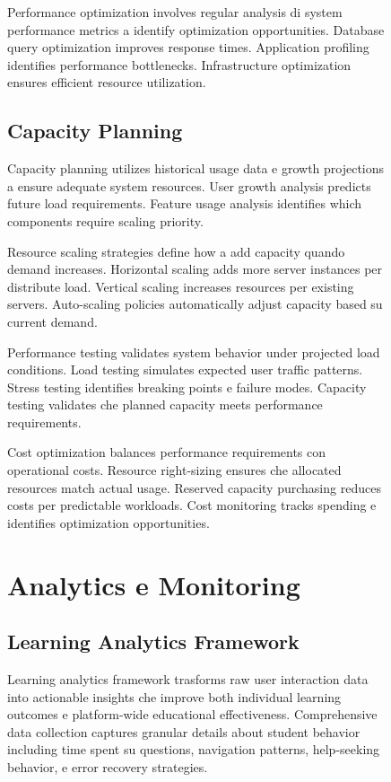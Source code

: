 \documentclass[12pt,a4paper]{article}
\begin{document}
\begin{figure}[H]
Performance optimization involves regular analysis di system performance metrics a identify optimization opportunities. Database query optimization improves response times. Application profiling identifies performance bottlenecks. Infrastructure optimization ensures efficient resource utilization.

\subsection{Capacity Planning}

Capacity planning utilizes historical usage data e growth projections a ensure adequate system resources. User growth analysis predicts future load requirements. Feature usage analysis identifies which components require scaling priority.

Resource scaling strategies define how a add capacity quando demand increases. Horizontal scaling adds more server instances per distribute load. Vertical scaling increases resources per existing servers. Auto-scaling policies automatically adjust capacity based su current demand.

Performance testing validates system behavior under projected load conditions. Load testing simulates expected user traffic patterns. Stress testing identifies breaking points e failure modes. Capacity testing validates che planned capacity meets performance requirements.

Cost optimization balances performance requirements con operational costs. Resource right-sizing ensures che allocated resources match actual usage. Reserved capacity purchasing reduces costs per predictable workloads. Cost monitoring tracks spending e identifies optimization opportunities.

\section{Analytics e Monitoring}

\subsection{Learning Analytics Framework}

Learning analytics framework trasforms raw user interaction data into actionable insights che improve both individual learning outcomes e platform-wide educational effectiveness. Comprehensive data collection captures granular details about student behavior including time spent su questions, navigation patterns, help-seeking behavior, e error recovery strategies.


\end{figure}
\end{document}
